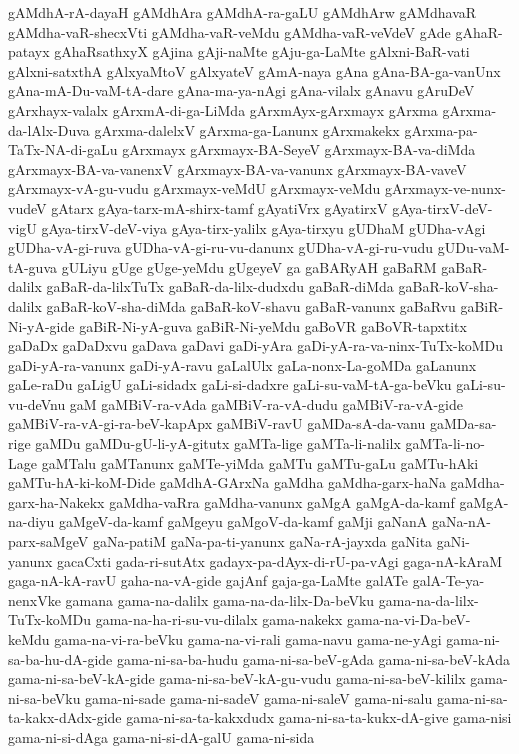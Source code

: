 {gAMdhA-rA-dayaH
gAMdhAra
gAMdhA-ra-gaLU
gAMdhArw
gAMdhavaR
gAMdha-vaR-shecxVti
gAMdha-vaR-veMdu
gAMdha-vaR-veVdeV
gAde
gAhaR-patayx
gAhaRsathxyX
gAjina
gAji-naMte
gAju-ga-LaMte
gAlxni-BaR-vati
gAlxni-satxthA
gAlxyaMtoV
gAlxyateV
gAmA-naya
gAna
gAna-BA-ga-vanUnx
gAna-mA-Du-vaM-tA-dare
gAna-ma-ya-nAgi
gAna-vilalx
gAnavu
gAruDeV
gArxhayx-valalx
gArxmA-di-ga-LiMda
gArxmAyx-gArxmayx
gArxma
gArxma-da-lAlx-Duva
gArxma-dalelxV
gArxma-ga-Lanunx
gArxmakekx
gArxma-pa-TaTx-NA-di-gaLu
gArxmayx
gArxmayx-BA-SeyeV
gArxmayx-BA-va-diMda
gArxmayx-BA-va-vanenxV
gArxmayx-BA-va-vanunx
gArxmayx-BA-vaveV
gArxmayx-vA-gu-vudu
gArxmayx-veMdU
gArxmayx-veMdu
gArxmayx-ve-nunx-vudeV
gAtarx
gAya-tarx-mA-shirx-tamf
gAyatiVrx
gAyatirxV
gAya-tirxV-deV-vigU
gAya-tirxV-deV-viya
gAya-tirx-yalilx
gAya-tirxyu
gUDhaM
gUDha-vAgi
gUDha-vA-gi-ruva
gUDha-vA-gi-ru-vu-danunx
gUDha-vA-gi-ru-vudu
gUDu-vaM-tA-guva
gULiyu
gUge
gUge-yeMdu
gUgeyeV
ga
gaBARyAH
gaBaRM
gaBaR-dalilx
gaBaR-da-lilxTuTx
gaBaR-da-lilx-dudxdu
gaBaR-diMda
gaBaR-koV-sha-dalilx
gaBaR-koV-sha-diMda
gaBaR-koV-shavu
gaBaR-vanunx
gaBaRvu
gaBiR-Ni-yA-gide
gaBiR-Ni-yA-guva
gaBiR-Ni-yeMdu
gaBoVR
gaBoVR-tapxtitx
gaDaDx
gaDaDxvu
gaDava
gaDavi
gaDi-yAra
gaDi-yA-ra-va-ninx-TuTx-koMDu
gaDi-yA-ra-vanunx
gaDi-yA-ravu
gaLalUlx
gaLa-nonx-La-goMDa
gaLanunx
gaLe-raDu
gaLigU
gaLi-sidadx
gaLi-si-dadxre
gaLi-su-vaM-tA-ga-beVku
gaLi-su-vu-deVnu
gaM
gaMBiV-ra-vAda
gaMBiV-ra-vA-dudu
gaMBiV-ra-vA-gide
gaMBiV-ra-vA-gi-ra-beV-kapApx
gaMBiV-ravU
gaMDa-sA-da-vanu
gaMDa-sa-rige
gaMDu
gaMDu-gU-li-yA-gitutx
gaMTa-lige
gaMTa-li-nalilx
gaMTa-li-no-Lage
gaMTalu
gaMTanunx
gaMTe-yiMda
gaMTu
gaMTu-gaLu
gaMTu-hAki
gaMTu-hA-ki-koM-Dide
gaMdhA-GArxNa
gaMdha
gaMdha-garx-haNa
gaMdha-garx-ha-Nakekx
gaMdha-vaRra
gaMdha-vanunx
gaMgA
gaMgA-da-kamf
gaMgA-na-diyu
gaMgeV-da-kamf
gaMgeyu
gaMgoV-da-kamf
gaMji
gaNanA
gaNa-nA-parx-saMgeV
gaNa-patiM
gaNa-pa-ti-yanunx
gaNa-rA-jayxda
gaNita
gaNi-yanunx
gacaCxti
gada-ri-sutAtx
gadayx-pa-dAyx-di-rU-pa-vAgi
gaga-nA-kAraM
gaga-nA-kA-ravU
gaha-na-vA-gide
gajAnf
gaja-ga-LaMte
galATe
galA-Te-ya-nenxVke
gamana
gama-na-dalilx
gama-na-da-lilx-Da-beVku
gama-na-da-lilx-TuTx-koMDu
gama-na-ha-ri-su-vu-dilalx
gama-nakekx
gama-na-vi-Da-beV-keMdu
gama-na-vi-ra-beVku
gama-na-vi-rali
gama-navu
gama-ne-yAgi
gama-ni-sa-ba-hu-dA-gide
gama-ni-sa-ba-hudu
gama-ni-sa-beV-gAda
gama-ni-sa-beV-kAda
gama-ni-sa-beV-kA-gide
gama-ni-sa-beV-kA-gu-vudu
gama-ni-sa-beV-kililx
gama-ni-sa-beVku
gama-ni-sade
gama-ni-sadeV
gama-ni-saleV
gama-ni-salu
gama-ni-sa-ta-kakx-dAdx-gide
gama-ni-sa-ta-kakxdudx
gama-ni-sa-ta-kukx-dA-give
gama-nisi
gama-ni-si-dAga
gama-ni-si-dA-galU
gama-ni-sida
}
